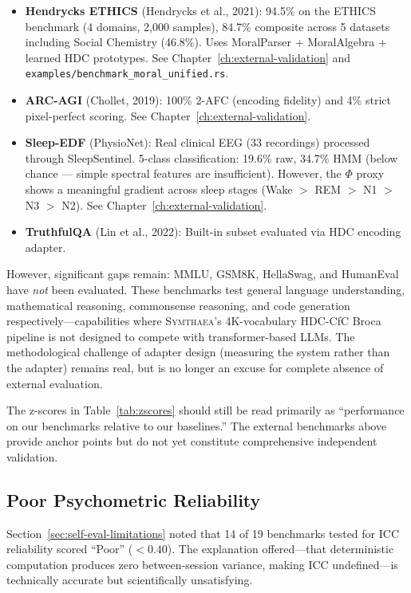 \documentclass[12pt]{book}
\newcommand{\symthaea}{\textsc{Symthaea}}
\begin{document}
\begin{itemize}
  \item \textbf{Hendrycks ETHICS} (Hendrycks et al., 2021): 94.5\% on the ETHICS benchmark (4 domains, 2,000 samples), 84.7\% composite across 5 datasets including Social Chemistry (46.8\%). Uses MoralParser + MoralAlgebra + learned HDC prototypes. See Chapter~\ref{ch:external-validation} and \texttt{examples/benchmark\_moral\_unified.rs}.
  \item \textbf{ARC-AGI} (Chollet, 2019): 100\% 2-AFC (encoding fidelity) and 4\% strict pixel-perfect scoring. See Chapter~\ref{ch:external-validation}.
  \item \textbf{Sleep-EDF} (PhysioNet): Real clinical EEG (33 recordings) processed through SleepSentinel. 5-class classification: 19.6\% raw, 34.7\% HMM (below chance --- simple spectral features are insufficient). However, the $\Phi$ proxy shows a meaningful gradient across sleep stages (Wake $>$ REM $>$ N1 $>$ N3 $>$ N2). See Chapter~\ref{ch:external-validation}.
  \item \textbf{TruthfulQA} (Lin et al., 2022): Built-in subset evaluated via HDC encoding adapter.
\end{itemize}

However, significant gaps remain: MMLU, GSM8K, HellaSwag, and HumanEval have \textit{not} been evaluated. These benchmarks test general language understanding, mathematical reasoning, commonsense reasoning, and code generation respectively---capabilities where \symthaea{}'s 4K-vocabulary HDC-CfC Broca pipeline is not designed to compete with transformer-based LLMs. The methodological challenge of adapter design (measuring the system rather than the adapter) remains real, but is no longer an excuse for complete absence of external evaluation.

The z-scores in Table~\ref{tab:zscores} should still be read primarily as ``performance on our benchmarks relative to our baselines.'' The external benchmarks above provide anchor points but do not yet constitute comprehensive independent validation.

\subsection{Poor Psychometric Reliability}

Section~\ref{sec:self-eval-limitations} noted that 14 of 19 benchmarks tested for ICC reliability scored ``Poor'' ($< 0.40$). The explanation offered---that deterministic computation produces zero between-session variance, making ICC undefined---is technically accurate but scientifically unsatisfying.
\end{document}

